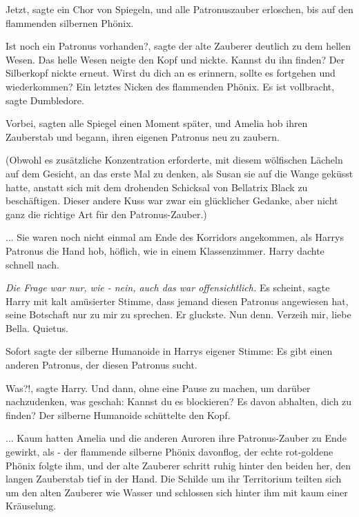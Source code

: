 \glqq{}Jetzt\grqq{}, sagte ein Chor von Spiegeln, und alle Patronuszauber
erloschen, bis auf den flammenden silbernen Phönix.

\glqq{}Ist noch ein Patronus vorhanden?\grqq{}, sagte der alte Zauberer deutlich
zu dem hellen Wesen. Das helle Wesen neigte den Kopf und nickte. \glqq{}Kannst du
ihn finden?\grqq{} Der Silberkopf nickte erneut. \glqq{}Wirst du dich an es erinnern,
sollte es fortgehen und wiederkommen?\grqq{} Ein letztes Nicken des flammenden
Phönix. \glqq{}Es ist vollbracht\grqq{}, sagte Dumbledore.

\glqq{}Vorbei\grqq{}, sagten alle Spiegel einen Moment später, und Amelia hob
ihren Zauberstab und begann, ihren eigenen Patronus neu zu zaubern.

(Obwohl es zusätzliche Konzentration erforderte, mit diesem wölfischen Lächeln
auf dem Gesicht, an das erste Mal zu denken, als Susan sie auf die Wange geküsst
hatte, anstatt sich mit dem drohenden Schicksal von Bellatrix Black zu
beschäftigen. Dieser andere Kuss war zwar ein glücklicher Gedanke, aber nicht
ganz die richtige Art für den Patronus-Zauber.)

... Sie waren noch nicht einmal am Ende des Korridors angekommen, als Harrys
Patronus die Hand hob, höflich, wie in einem Klassenzimmer. Harry dachte schnell
nach.\emph{}

\emph{Die Frage war nur, wie - nein, auch das war offensichtlich.}
\glqq{}Es scheint\grqq{}, sagte Harry mit kalt amüsierter Stimme, \glqq{}dass
jemand diesen Patronus angewiesen hat, seine Botschaft nur zu mir zu sprechen.\grqq{}
Er gluckste. \glqq{}Nun denn. Verzeih mir, liebe Bella. Quietus.\grqq{}

Sofort sagte der silberne Humanoide in Harrys eigener Stimme: \glqq{}Es gibt
einen anderen Patronus, der diesen Patronus sucht.\grqq{}

\glqq{}Was?!\grqq{}, sagte Harry. Und dann, ohne eine Pause zu machen, um darüber
nachzudenken, was geschah: \glqq{}Kannst du es blockieren? Es davon abhalten,
dich zu finden?\grqq{} Der silberne Humanoide schüttelte den Kopf.

... Kaum hatten Amelia und die anderen Auroren ihre Patronus-Zauber zu Ende
gewirkt, als - der flammende silberne Phönix davonflog, der echte rot-goldene
Phönix folgte ihm, und der alte Zauberer schritt ruhig hinter den beiden her,
den langen Zauberstab tief in der Hand. Die Schilde um ihr Territorium teilten
sich um den alten Zauberer wie Wasser und schlossen sich hinter ihm mit kaum
einer Kräuselung.

